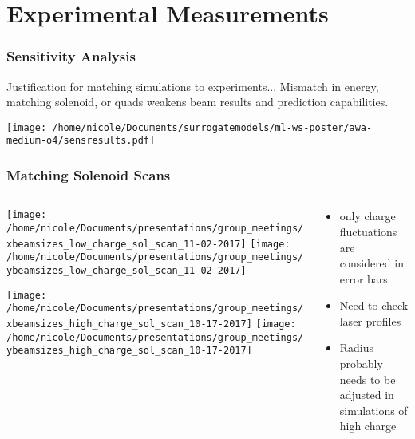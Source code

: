 \documentclass[professionalfonts,t]{beamer}
\begin{document}
\section{Experimental Measurements}


\begin{frame}
\frametitle{Sensitivity Analysis}

\vspace{-0.5em}
Justification for matching simulations to experiments...
Mismatch in energy, matching solenoid, or quads weakens beam results and prediction capabilities.

\centering
\texttt{[image: /home/nicole/Documents/surrogatemodels/ml-ws-poster/awa-medium-o4/sensresults.pdf]}
\end{frame}


\begin{frame}[t]
\frametitle{Matching Solenoid Scans}
\begin{columns}[T]
	\begin{column}{0.76\textwidth}
		\begin{minipage}{0.5\textheight}
			\texttt{[image: /home/nicole/Documents/presentations/group\_meetings/xbeamsizes\_low\_charge\_sol\_scan\_11-02-2017]}	\texttt{[image: /home/nicole/Documents/presentations/group\_meetings/ybeamsizes\_low\_charge\_sol\_scan\_11-02-2017]}
		\end{minipage}
		\begin{minipage}{0.5\textheight}
			\texttt{[image: /home/nicole/Documents/presentations/group\_meetings/xbeamsizes\_high\_charge\_sol\_scan\_10-17-2017]}
			\texttt{[image: /home/nicole/Documents/presentations/group\_meetings/ybeamsizes\_high\_charge\_sol\_scan\_10-17-2017]}
		\end{minipage}
	\end{column}
	\begin{column}{0.4\textwidth}
		\begin{itemize}
			\item only charge fluctuations are considered in error bars
			\item Need to check laser profiles  
			\item Radius probably needs to be adjusted in simulations of high charge
		\end{itemize}
	\end{column}
\end{columns}

\end{frame}
\end{document}
